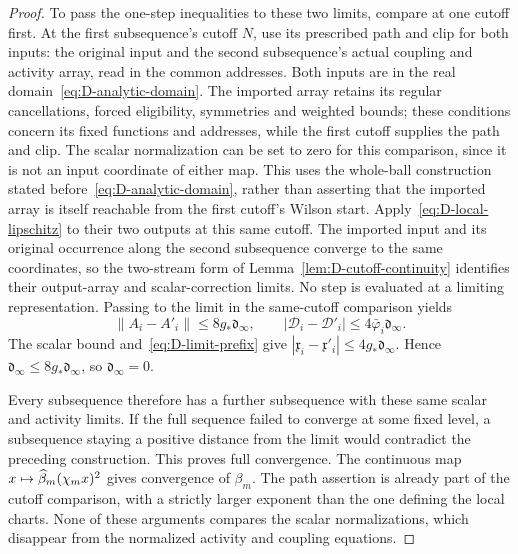 \begin{proof}
To pass the one-step inequalities to these two limits, compare at one cutoff first. At the first subsequence's cutoff $N$, use its prescribed path and clip for both inputs: the original input and the second subsequence's actual coupling and activity array, read in the common addresses. Both inputs are in the real domain~\eqref{eq:D-analytic-domain}. The imported array retains its regular cancellations, forced eligibility, symmetries and weighted bounds; these conditions concern its fixed functions and addresses, while the first cutoff supplies the path and clip. The scalar normalization can be set to zero for this comparison, since it is not an input coordinate of either map. This uses the whole-ball construction stated before~\eqref{eq:D-analytic-domain}, rather than asserting that the imported array is itself reachable from the first cutoff's Wilson start. Apply~\eqref{eq:D-local-lipschitz} to their two outputs at this same cutoff. The imported input and its original occurrence along the second subsequence converge to the same coordinates, so the two-stream form of Lemma~\ref{lem:D-cutoff-continuity} identifies their output-array and scalar-correction limits. No step is evaluated at a limiting representation. Passing to the limit in the same-cutoff comparison yields
\[
 \|A_i-A'_i\|\le8g_*\mathfrak d_\infty,
 \qquad |\mathcal D_i-\mathcal D'_i|\le4\bar\varphi_i\mathfrak d_\infty.
\]
The scalar bound and~\eqref{eq:D-limit-prefix} give $|\mathfrak x_i-\mathfrak x'_i|\le4g_*\mathfrak d_\infty$. Hence $\mathfrak d_\infty\le8g_*\mathfrak d_\infty$, so $\mathfrak d_\infty=0$.

Every subsequence therefore has a further subsequence with these same scalar and activity limits. If the full sequence failed to converge at some fixed level, a subsequence staying a positive distance from the limit would contradict the preceding construction. This proves full convergence. The continuous map $x\mapsto\widehat{\beta}_m(\chi_mx)^2$ gives convergence of $\beta_m$. The path assertion is already part of the cutoff comparison, with a strictly larger exponent than the one defining the local charts. None of these arguments compares the scalar normalizations, which disappear from the normalized activity and coupling equations.
\end{proof}

